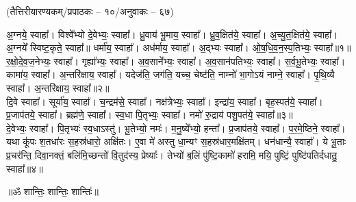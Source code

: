 
\vspace{-1ex}
\centerline{\normalsize (तैत्तिरीयारण्यकम्/प्रपाठकः – १०/अनुवाकः – ६७)}
अ॒ग्नये॒ स्वाहा᳚। विश्वे᳚भ्यो दे॒वेभ्यः॒ स्वाहा᳚। ध्रु॒वाय॑ भू॒माय॒ स्वाहा᳚। ध्रु॒व॒क्षित॑ये॒ स्वाहा᳚। अ॒च्यु॒त॒क्षित॑ये॒ स्वाहा᳚। अ॒ग्नये᳚ स्विष्ट॒कृते॒ स्वाहा᳚॥ धर्मा॑य॒ स्वाहा᳚। अध॑र्माय॒ स्वाहा᳚। अ॒द्भ्यः स्वाहा᳚। ओ॒ष॒धि॒व॒न॒स्प॒तिभ्यः॒ स्वाहा᳚॥१॥ \\
र॒क्षो॒दे॒व॒ज॒नेभ्यः॒ स्वाहा᳚। गृह्या᳚भ्यः॒ स्वाहा᳚। अ॒व॒साने᳚भ्यः॒ स्वाहा᳚। अ॒व॒सान॑पतिभ्यः॒ स्वाहा᳚। स॒र्व॒भू॒तेभ्यः॒ स्वाहा᳚। कामा॑य॒ स्वाहा᳚। अ॒न्तरि॑क्षाय॒ स्वाहा᳚। यदेज॑ति॒ जग॑ति॒ यच्च॒ चेष्ट॑ति॒ नाम्नो॑ भा॒गोऽयं नाम्ने॒ स्वाहा᳚। पृ॒थि॒व्यै स्वाहा᳚। अ॒न्तरि॑क्षाय॒ स्वाहा᳚॥२॥ \\
दि॒वे स्वाहा᳚। सूर्या॑य॒ स्वाहा᳚। च॒न्द्रम॑से॒ स्वाहा᳚। नक्ष॑त्रेभ्यः॒ स्वाहा᳚। इन्द्रा॑य॒ स्वाहा᳚। बृह॒स्पत॑ये॒ स्वाहा᳚। प्र॒जाप॑तये॒ स्वाहा᳚। ब्रह्म॑णे॒ स्वाहा᳚। स्व॒धा पि॒तृभ्यः॒ स्वाहा᳚। नमो॑ रु॒द्राय॑ पशु॒पत॑ये॒ स्वाहा᳚॥३॥\\
  दे॒वेभ्यः॒ स्वाहा᳚। पि॒तृभ्यः॑ स्व॒धाऽस्तु॑। भू॒तेभ्यो॒ नमः॑। म॒नु॒ष्ये᳚भ्यो॒ हन्ता᳚। प्र॒जाप॑तये॒ स्वाहा᳚। प॒र॒मे॒ष्ठिने॒ स्वाहा᳚। यथा कू॑पः श॒तधा॑रः स॒हस्र॑धारो॒ अक्षि॑तः। ए॒वा मे॑ अस्तु धा॒न्यꣳ स॒हस्र॑धार॒मक्षि॑तम्। धन॑धान्यै॒ स्वाहा᳚। ये भू॒ताः प्र॒चर॑न्ति॒ दिवा॒नक्तं॒ बलि॑मि॒च्छन्तो॑ वि॒तुद॑स्य॒ प्रेष्याः᳚। तेभ्यो॑ ब॒लिं पु॑ष्टि॒कामो॑ हरामि॒ मयि॒ पुष्टिं॒ पुष्टि॑पतिर्दधातु॒ स्वाहा᳚॥४॥ 

\centerline{॥ॐ शान्तिः॒ शान्तिः॒ शान्तिः॑॥}